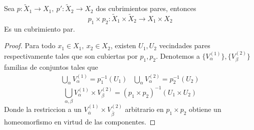 \begin{teorema}
  Sea \(p : \tilde X _1 \to X_1,\ p' : \tilde X _2 \to X_2 \) dos
  cubrimientos pares, entonces
  \[ p_1 \times p_2 : \tilde X _1 \times \tilde X _2 \to X_1 \times X_2 \]
  Es un cubrimiento par.
\end{teorema}
\begin{proof}
  Para todo \(x_1 \in X_1,\ x_2 \in X_2\), existen \(U_1, U_2\)
  vecindades pares respectivamente tales que son cubiertas por \(p_1,
  p_2\). Denotemos a \(\{V_\alpha^{(1)}\}, \{V_\beta^{(2)}\}\) familias
  de conjuntos tales que
  \[
    \begin{matrix}
      \bigcup_{\alpha} V_\alpha^{(1)} = p_1^{-1} (U_1) &
      \bigcup_{\alpha} V_\alpha^{(2)} = p_2^{-1} (U_2)
    \end{matrix}
  \]
  \[ \bigcup_{\alpha, \beta} V_\alpha^{(1)} \times V_\beta^{(2)} = (p_1
    \times p_2)^{-1} (U_1 \times U_2)\]
  Donde la restriccion a un \(V_{\bar{\alpha}}^{(1)} \times
  V_{\bar{\beta}}^{(2)}\) arbitrario en \(p_1 \times p_2\) obtiene un
  homeomorfismo en virtud de las componentes.
\end{proof}
